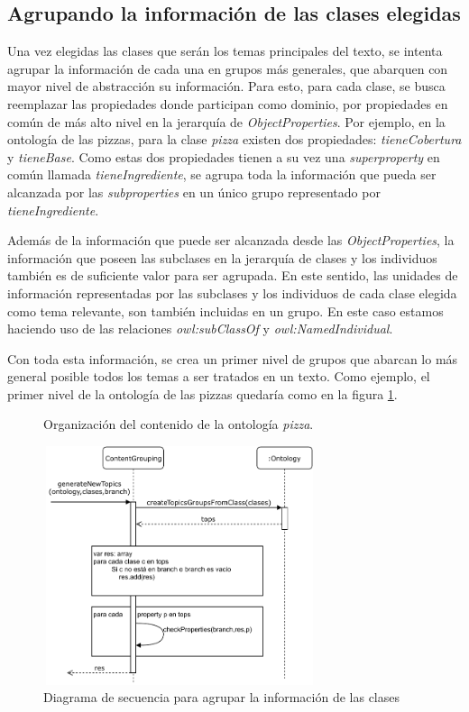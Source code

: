 \subsection{Agrupando la información de las clases elegidas}
\label{sec:agrupando_info}
Una vez elegidas las clases que serán los temas principales del texto, se intenta agrupar la información de cada una en grupos más generales, que abarquen con mayor nivel de abstracción su información. Para esto, para cada clase, se busca reemplazar las propiedades donde participan como dominio, por propiedades en común de más alto nivel en la jerarquía de \emph{ObjectProperties}. Por ejemplo, en la ontología de las pizzas, para la clase \emph{pizza} existen dos propiedades: \emph{tieneCobertura} y \emph{tieneBase}. Como estas dos propiedades tienen a su vez una \emph{superproperty} en común llamada \emph{tieneIngrediente}, se agrupa toda la información que pueda ser alcanzada por las \emph{subproperties} en un único grupo representado por \emph{tieneIngrediente}. 

Además de la información que puede ser alcanzada desde las \emph{ObjectProperties}, la información que poseen las subclases en la jerarquía de clases y los individuos también es de suficiente valor para ser agrupada. En este sentido, las unidades de información representadas por las subclases y los individuos de cada clase elegida como tema relevante, son también incluidas en un grupo. En este caso estamos haciendo uso de las relaciones \emph{owl:subClassOf} y \emph{owl:NamedIndividual}.

Con toda esta información, se crea un primer nivel de grupos que abarcan lo más general posible todos los temas a ser tratados en un texto. Como ejemplo, el primer nivel de la ontología de las pizzas quedaría como en la figura \ref{fig:macro_planning_pizza}.
\begin{figure}[H]
\caption{Organización del contenido de la ontología \emph{pizza}.}
\label{fig:macro_planning_pizza}
\end{figure}

\begin{figure}[H]
    \centering
    \includegraphics[width=8cm, height=7cm]{img/organizacion_informacion/secuencia_contentGrouping.pdf}
    \caption{Diagrama de secuencia para agrupar la información de las clases}
    \label{fig:diagrama_secuencia_contentGrouping}
\end{figure}


